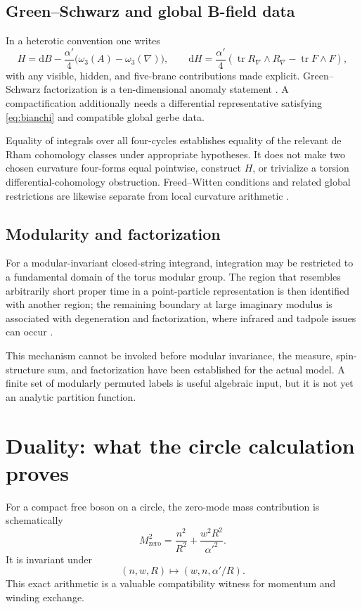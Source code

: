 \documentclass[11pt]{article}
\theoremstyle{definition}
\theoremstyle{remark}
\newcommand{\dd}{\mathrm d}
\newcommand{\tr}{\operatorname{tr}}
\begin{document}
\subsection{Green--Schwarz and global B-field data}

In a heterotic convention one writes
\[
H=\dd B-\frac{\alpha'}4
\bigl(\omega_3(A)-\omega_3(\nabla)\bigr),
\qquad
\dd H=\frac{\alpha'}4
\left(\tr R_\nabla\wedge R_\nabla-\tr F\wedge F\right),
\label{eq:bianchi}
\]
with any visible, hidden, and five-brane contributions made explicit.
Green--Schwarz factorization is a ten-dimensional anomaly statement
\cite{GreenSchwarz1984}.  A compactification additionally needs a
differential representative satisfying \cref{eq:bianchi} and compatible
global gerbe data.

Equality of integrals over all four-cycles establishes equality of the
relevant de Rham cohomology classes under appropriate hypotheses.  It does
not make two chosen curvature four-forms equal pointwise, construct \(H\), or
trivialize a torsion differential-cohomology obstruction.  Freed--Witten
conditions and related global restrictions are likewise separate from local
curvature arithmetic \cite{FreedWitten1999}.

\subsection{Modularity and factorization}

For a modular-invariant closed-string integrand, integration may be
restricted to a fundamental domain of the torus modular group.  The region
that resembles arbitrarily short proper time in a point-particle
representation is then identified with another region; the remaining
boundary at large imaginary modulus is associated with degeneration and
factorization, where infrared and tadpole issues can occur
\cite{Witten2012,SenUVIR2016}.

This mechanism cannot be invoked before modular invariance, the measure,
spin-structure sum, and factorization have been established for the actual
model.  A finite set of modularly permuted labels is useful algebraic input,
but it is not yet an analytic partition function.

\section{Duality: what the circle calculation proves}
\label{sec:duality}

For a compact free boson on a circle, the zero-mode mass contribution is
schematically
\[
M^2_{\mathrm{zero}}
=\frac{n^2}{R^2}+\frac{w^2R^2}{\alpha'^2}.
\]
It is invariant under
\[
(n,w,R)\longmapsto(w,n,\alpha'/R).
\]
This exact arithmetic is a valuable compatibility witness for momentum and
winding exchange.
\end{document}
